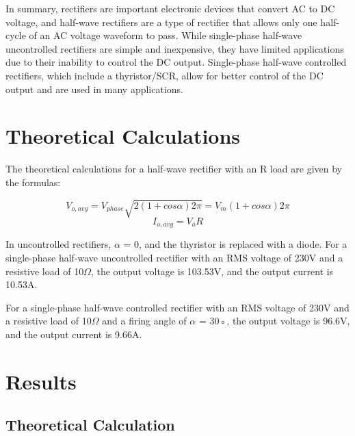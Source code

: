 In summary, rectifiers are important electronic devices that convert AC to DC voltage, and half-wave rectifiers are a type of rectifier that allows only one half-cycle of an AC voltage waveform to pass. While single-phase half-wave uncontrolled rectifiers are simple and inexpensive, they have limited applications due to their inability to control the DC output. Single-phase half-wave controlled rectifiers, which include a thyristor/SCR, allow for better control of the DC output and are used in many applications.



\section{Theoretical Calculations}
\hspace{\parindent}
The theoretical calculations for a half-wave rectifier with an R load are given by the formulas:


$$
    V_{o,avg} =
    V_{phase}
    \sqrt{2(1 + cos\alpha)2\pi} =
    V_m(1 + cos\alpha)
    2\pi
$$
$$
    I_{o,avg} =
    V_oR
$$

In uncontrolled rectifiers, $ \alpha$ = 0, and the thyristor is replaced with a diode.
For a single-phase half-wave uncontrolled rectifier with an RMS voltage of 230V
and a resistive load of 10$ \Omega $,
the output voltage is 103.53V, and the output current is 10.53A.

For a single-phase half-wave controlled rectifier with an RMS voltage of 230V
and a resistive load of 10$ \Omega $ and a firing angle of $ \alpha  $ = 30◦, the output voltage
is 96.6V, and the output current is 9.66A.

\pagebreak

% 
% 
% 
% 
% 
% 
% 

\section{Results}
\subsection{Theoretical Calculation}


